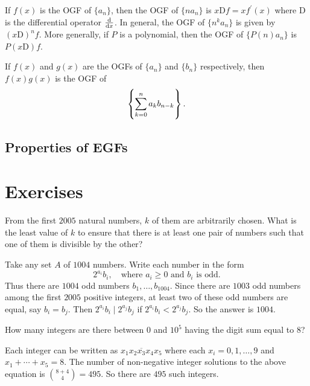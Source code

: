 \begin{proposition}
If $f(x)$ is the OGF of $\{a_n\}$, then the OGF of $\{na_n\}$ is $x\mathrm{D}f=xf^\prime(x)$ where $\mathrm{D}$ is the differential operator $\dv{}{x}$. In general, the OGF of $\{n^ka_n\}$ is given by $(x\mathrm{D})^nf$. More generally, if $P$ is a polynomial, then the OGF of $\{P(n)a_n\}$ is $P(x\mathrm{D})f$.
\end{proposition}

\begin{proposition}
If $f(x)$ and $g(x)$ are the OGFs of $\{a_n\}$ and $\{b_n\}$ respectively, then $f(x)g(x)$ is the OGF of
\[ \left\{\sum_{k=0}^na_kb_{n-k}\right\}. \]
\end{proposition}

\subsection{Properties of EGFs}

\pagebreak


\section*{Exercises}

\begin{prbm}
From the first $2005$ natural numbers, $k$ of them are arbitrarily chosen. What is the least value of $k$ to ensure that there is at least one pair of numbers such that one of them is divisible by the other?
\end{prbm}

\begin{solution}
Take any set $A$ of $1004$ numbers. Write each number in the form 
\[2^{a_i}b_i,\quad\text{where $a_i\ge0$ and $b_i$ is odd}.\]
Thus there are $1004$ odd numbers $b_1,\dots,b_{1004}$. Since there are $1003$ odd numbers among the first $2005$ positive integers, at least two of these odd numbers are equal, say $b_i=b_j$. Then $2^{a_i}b_i\mid 2^{a_j}b_j$ if $2^{a_i}b_i<2^{a_j}b_j$. So the answer is $1004$.
\end{solution}

\begin{prbm}
How many integers are there between $0$ and $10^5$ having the digit sum equal to $8$?
\end{prbm}

\begin{solution}
Each integer can be written as $\overline{x_1x_2x_3x_4x_5}$ where each $x_i=0,1,\dots,9$ and $x_1+\cdots+x_5=8$. The number of non-negative integer solutions to the above equation is $\binom{8+4}{4}=495$. So there are $495$ such integers.
\end{solution}

